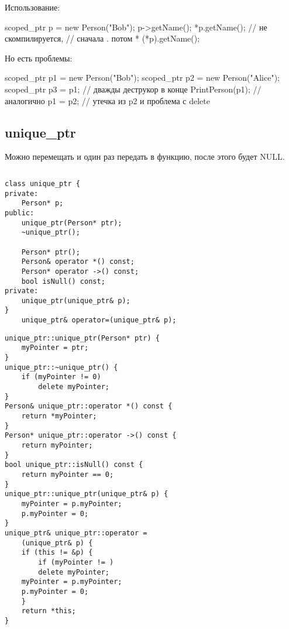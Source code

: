 $ $

\begin{minipage}{0.45\textwidth}
Использование:
\begin{ccode}
scoped_ptr p = new Person("Bob");
p->getName();
*p.getName(); // не скомпилируется,
// сначала . потом *
(*p).getName();
\end{ccode}
\end{minipage}
\hfill
\begin{minipage}{0.45\textwidth}
Но есть проблемы:
\begin{ccode}
scoped_ptr p1 = new Person("Bob");
scoped_ptr p2 = new Person("Alice");
scoped_ptr p3 = p1; // дважды деструкор в конце
PrintPerson(p1); // аналогично
p1 = p2; // утечка из p2 и проблема с delete
\end{ccode}
\end{minipage}
\subsection{unique\_ptr}
Можно перемещать и один раз передать в функцию, после этого будет NULL.

$ $

\begin{minipage}{0.45\textwidth}
\begin{verbatim}
class unique_ptr {
private:
    Person* p;
public:
    unique_ptr(Person* ptr);
    ~unique_ptr();

    Person* ptr();
    Person& operator *() const;
    Person* operator ->() const;
    bool isNull() const;
private:
    unique_ptr(unique_ptr& p);
}
    unique_ptr& operator=(unique_ptr& p);
\end{verbatim}
\end{minipage}
\hfill
\begin{minipage}{0.45\textwidth}
\begin{verbatim}
unique_ptr::unique_ptr(Person* ptr) {
    myPointer = ptr;
}
unique_ptr::~unique_ptr() {
    if (myPointer != 0) 
        delete myPointer;
}
Person& unique_ptr::operator *() const {
    return *myPointer;
}
Person* unique_ptr::operator ->() const {
    return myPointer;
}
bool unique_ptr::isNull() const {
    return myPointer == 0;
}
unique_ptr::unique_ptr(unique_ptr& p) {
    myPointer = p.myPointer;
    p.myPointer = 0;
}
unique_ptr& unique_ptr::operator =
	(unique_ptr& p) {
    if (this != &p) {
        if (myPointer != ) 
	    delete myPointer;
	myPointer = p.myPointer;
	p.myPointer = 0;
    }
    return *this;
}
\end{verbatim}
\end{minipage}
